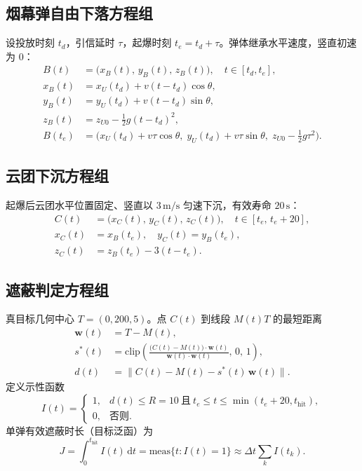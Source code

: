 \documentclass[withoutpreface,bwprint]{cumcmthesis}
\begin{document}
\subsection{烟幕弹自由下落方程组}
设投放时刻 $t_d$，引信延时 $\tau$，起爆时刻 $t_e=t_d+\tau$。弹体继承水平速度，竖直初速为 0：
\begin{equation}
\begin{aligned}
B(t)&=\big(x_B(t),\,y_B(t),\,z_B(t)\big),\quad t\in[t_d,t_e],\\
x_B(t)&=x_U(t_d)+v(t-t_d)\cos\theta,\\
y_B(t)&=y_U(t_d)+v(t-t_d)\sin\theta,\\
z_B(t)&=z_{U0}-\frac12 g(t-t_d)^2,\\
B(t_e)&=\Big(
x_U(t_d)+v\tau\cos\theta,\;
y_U(t_d)+v\tau\sin\theta,\;
z_{U0}-\frac12 g\tau^2
\Big).
\end{aligned}
\label{eq:bomb-sys}
\end{equation}

\subsection{云团下沉方程组}
起爆后云团水平位置固定、竖直以 $3\,\mathrm{m/s}$ 匀速下沉，有效寿命 $20\,\mathrm{s}$：
\begin{equation}
\begin{aligned}
C(t)&=\big(x_C(t),\,y_C(t),\,z_C(t)\big),\quad
t\in[t_e,\,t_e+20],\\
x_C(t)&=x_B(t_e),\quad
y_C(t)=y_B(t_e),\\
z_C(t)&=z_B(t_e)-3(t-t_e).
\end{aligned}
\label{eq:cloud-sys}
\end{equation}

\subsection{遮蔽判定方程组}
真目标几何中心 $T=(0,200,5)$。点 $C(t)$ 到线段 $M(t)T$ 的最短距离
\begin{equation}
\begin{aligned}
\mathbf{w}(t)&=T-M(t),\\
s^\ast(t)&=\mathrm{clip}\!\left(
\frac{\big(C(t)-M(t)\big)\cdot\mathbf{w}(t)}{\mathbf{w}(t)\cdot\mathbf{w}(t)},\,0,\,1
\right),\\
d(t)&=\big\|C(t)-M(t)-s^\ast(t)\,\mathbf{w}(t)\big\|.
\end{aligned}
\label{eq:dist-sys}
\end{equation}
定义示性函数
\begin{equation}
I(t)=\begin{cases}
1,& d(t)\le R=10\ \text{且}\ t_e\le t\le\min(t_e+20,t_{\mathrm{hit}}),\\
0,& \text{否则}.
\end{cases}
\label{eq:indicator}
\end{equation}
单弹有效遮蔽时长（目标泛函）为
\begin{equation}
J=\int_{0}^{t_{\mathrm{hit}}} I(t)\,\mathrm{d}t
=\mathrm{meas}\{t:I(t)=1\}
\approx\Delta t\sum_{k}I(t_k).
\label{eq:J}
\end{equation}
\end{document}
